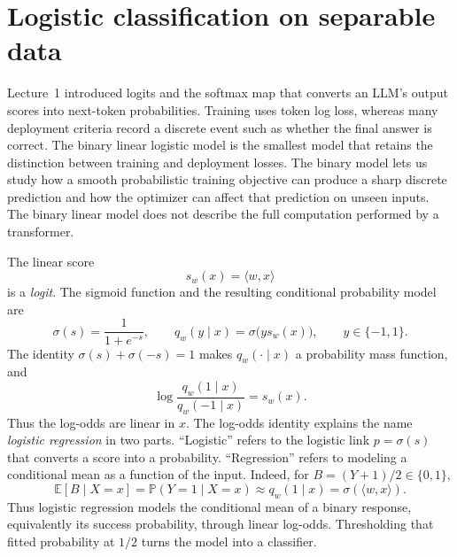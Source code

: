 \documentclass[11pt,twoside]{article}
\newcommand{\E}{\mathbb E}
\renewcommand{\P}{\mathbb P}
\theoremstyle{definition}
\theoremstyle{remark}
\begin{document}
\section{Logistic classification on separable data}
\label{sec:max-margin}

Lecture~1 introduced logits and the softmax map that converts an LLM's output
scores into next-token probabilities. Training uses token log loss, whereas
many deployment criteria record a discrete event such as whether the final
answer is correct. The binary linear logistic model is the smallest model
that retains the distinction between training and deployment losses.
The binary model lets us study how a smooth probabilistic training objective
can produce a sharp discrete prediction and how the optimizer can affect that
prediction on unseen inputs. The binary linear model does not describe the
full computation performed by a transformer.

The linear score
\[
 s_w(x)=\langle w,x\rangle
\]
is a \emph{logit}. The sigmoid function and the resulting conditional
probability model are
\[
 \sigma(s)=\frac1{1+e^{-s}},
 \qquad
 q_w(y\mid x)=\sigma\bigl(ys_w(x)\bigr),
 \qquad y\in\{-1,1\}.
\]
The identity $\sigma(s)+\sigma(-s)=1$ makes $q_w(\cdot\mid x)$ a probability
mass function, and
\[
 \log\frac{q_w(1\mid x)}{q_w(-1\mid x)}=s_w(x).
\]
Thus the log-odds are linear in $x$. The log-odds identity explains the name
\emph{logistic regression} in two parts. ``Logistic'' refers to the logistic
link $p=\sigma(s)$ that converts a score into a probability. ``Regression''
refers to modeling a conditional mean as a function of the input. Indeed, for
$B=(Y+1)/2\in\{0,1\}$,
\[
 \E[B\mid X=x]=\P(Y=1\mid X=x)
 \approx q_w(1\mid x)=\sigma(\langle w,x\rangle).
\]
Thus logistic regression models the conditional mean of a binary response,
equivalently its success probability, through linear log-odds. Thresholding
that fitted probability at $1/2$ turns the model into a classifier.
\end{document}

